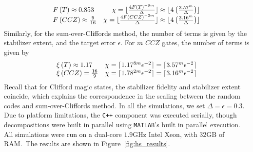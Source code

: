 \begin{equation}
\begin{array}{l r}
F\left(T\right)\approx 0.853 & \chi = \lfloor\frac{4 F\left(T\right)^{-8m}}{\Delta}\rfloor \approx \lfloor 4\left(\frac{3.57^{m}}{\Delta}\right)\rfloor\\ 
F\left(CCZ\right)\approx \frac{9}{16} & \chi = \lfloor\frac{4 F\left(CCZ\right)^{-2m}}{\Delta}\rfloor \approx \lfloor 4\left(\frac{3.16^{m}}{\Delta}\right)\rfloor\\ 
\end{array}
\end{equation}
Similarly, for the sum-over-Cliffords method, the number of terms is given by the stabilizer extent, and the target error $\epsilon$. For $m$ $CCZ$ gates, the number of terms is given by
\begin{equation}
\begin{array}{l r}
\xi\left(T\right) \approx 1.17 & \chi = \lceil 1.17^{8m} \epsilon^{-2}\rceil = \lceil 3.57^{m}\epsilon^{-2}\rceil \\
\xi\left(CCZ\right) = \frac{16}{9} & \chi = \lceil 1.78^{2m}\epsilon^{-2}\rceil = \lceil 3.16^{m}\epsilon^{-2}\rceil
\end{array}
\end{equation}
Recall that for Clifford magic states, the stabilizer fidelity and stabilizer extent coincide, which explains the correspondence in the scaling between the random codes and sum-over-Cliffords method. In all the simulations, we set $\Delta=\epsilon=0.3$. Due to platform limitations, the \texttt{C++} component was executed serially, though decompositions were built in parallel using \texttt{MATLAB}'s built in parallel execution. All simulations were run on a dual-core $1.9\mathrm{GHz}$ Intel Xeon, with $32\mathrm{GB}$ of RAM.\ The results are shown in Figure~\ref{fig:hs_results}.
